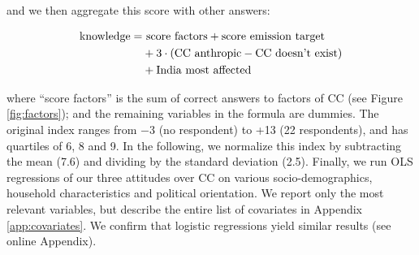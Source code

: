 \documentclass[english,5p,authoryear]{elsarticle}
\begin{document}
and we then aggregate this score with other answers:

\begin{align}
\textnormal{knowledge}= & \textnormal{ score factors}+\textnormal{score emission target} \nonumber\\
 & +3\cdot\left(\textnormal{CC anthropic}-\textnormal{CC doesn't exist}\right) \nonumber \\
 & +\textnormal{India most affected} \label{eq:knowledge2}
\end{align}

where ``score factors'' is the sum of correct answers to factors of CC (see Figure \ref{fig:factors}); and the remaining variables in the formula are dummies. The original index ranges from $-$3 (no respondent) to +13 (22 respondents), and has quartiles of 6, 8 and 9. In the following, we normalize this index by subtracting the mean (7.6) and dividing by the standard deviation (2.5). Finally, we run OLS regressions of our three attitudes over CC on various socio-demographics, household characteristics and political orientation. We report only the most relevant variables, but describe the entire list of covariates in Appendix \ref{app:covariates}. We confirm that logistic regressions yield similar results (see online Appendix).
\end{document}
